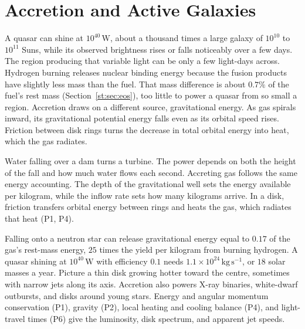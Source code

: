 \section{Accretion and Active Galaxies}
\label{fp:sec:accretion}

A quasar can shine at $10^{40}\,\mathrm W$, about a thousand times a large galaxy of $10^{10}$ to $10^{11}$ Suns, while its observed brightness rises or falls noticeably over a few days. The region producing that variable light can be only a few light-days across. Hydrogen burning releases nuclear binding energy because the fusion products have slightly less mass than the fuel. That mass difference is about $0.7\%$ of the fuel's rest mass (Section~\ref{st:sec:eos}), too little to power a quasar from so small a region. Accretion draws on a different source, gravitational energy. As gas spirals inward, its gravitational potential energy falls even as its orbital speed rises. Friction between disk rings turns the decrease in total orbital energy into heat, which the gas radiates.

Water falling over a dam turns a turbine. The power depends on both the height of the fall and how much water flows each second. Accreting gas follows the same energy accounting. The depth of the gravitational well sets the energy available per kilogram, while the inflow rate sets how many kilograms arrive. In a disk, friction transfers orbital energy between rings and heats the gas, which radiates that heat (P1, P4).

Falling onto a neutron star can release gravitational energy equal to $0.17$ of the gas's rest-mass energy, $25$ times the yield per kilogram from burning hydrogen. A quasar shining at $10^{40}\,\mathrm W$ with efficiency $0.1$ needs $1.1\times10^{24}\,\mathrm{kg\,s^{-1}}$, or $18$ solar masses a year. Picture a thin disk growing hotter toward the centre, sometimes with narrow jets along its axis. Accretion also powers X-ray binaries, white-dwarf outbursts, and disks around young stars. Energy and angular momentum conservation (P1), gravity (P2), local heating and cooling balance (P4), and light-travel times (P6) give the luminosity, disk spectrum, and apparent jet speeds.

